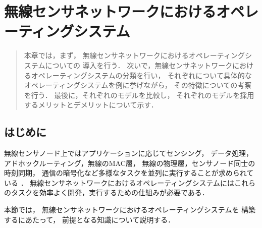\chapter{無線センサネットワークにおけるオペレーティングシステム}\label{chap:os_in_WSN}
\begin{large}
\begin{quote}
本章では，まず，
無線センサネットワークにおけるオペレーティングシステムについての
導入を行う．
次いで，無線センサネットワークにおけるオペレーティングシステムの分類を行い，
それぞれについて具体的なオペレーティングシステムを例に挙げながら，
その特徴についての考察を行う．
最後に，それぞれのモデルを比較し，
それぞれのモデルを採用するメリットとデメリットについて示す．
\end{quote}
\end{large}
\clearpage


\section{はじめに}
無線センサノード上ではアプリケーションに応じてセンシング，
データ処理，アドホックルーティング，無線のMAC層，
無線の物理層，センサノード同士の時刻同期，
通信の暗号化など多様なタスクを並列に実行することが求められている
\cite{10.1109/IISWC.2005.1526017}．
無線センサネットワークにおけるオペレーティングシステムにはこれら
のタスクを効率よく開発，実行するための仕組みが必要である．

本節では，
無線センサネットワークにおけるオペレーティングシステムを
構築するにあたって，
前提となる知識について説明する．

%
%



